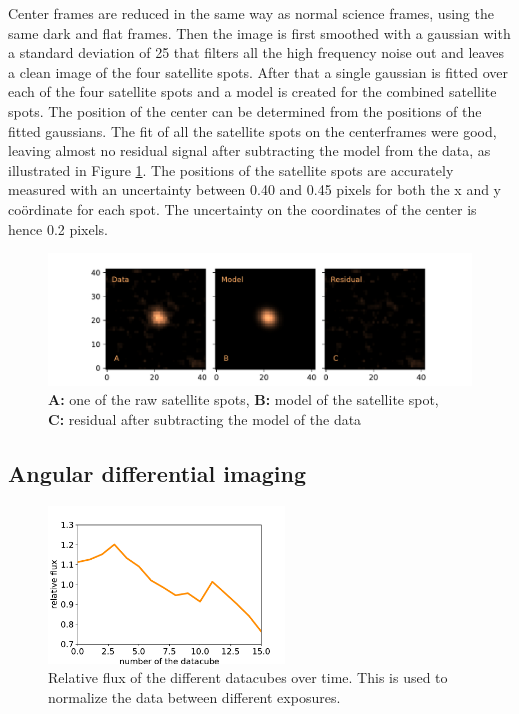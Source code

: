 \documentclass[twoside,single]{lion-msc}
\begin{document}
\bigskip
Center frames are reduced in the same way as normal science frames, using the same dark and flat frames. Then the image is first smoothed with a gaussian with a standard deviation of 25 that filters all the high frequency noise out and leaves a clean image of the four satellite spots. After that a single gaussian is fitted over each of the four satellite spots and a model is created for the combined satellite spots. The position of the center can be determined from the positions of the fitted gaussians. The fit of all the satellite spots on the centerframes were good, leaving almost no residual signal after subtracting the model from the data, as illustrated in Figure \ref{fig:resultmodel}. The positions of the satellite spots are accurately measured with an uncertainty between 0.40 and 0.45 pixels for both the x and y co\"ordinate for each spot. The uncertainty on the coordinates of the center is hence 0.2 pixels.

\begin{figure}[!t]
\centering 
\includegraphics[width = \textwidth]{resultmodel}
\caption{\textbf{A:} one of the raw satellite spots, \textbf{B:} model of the satellite spot,\\ \textbf{C:} residual after subtracting the model of the data} 
\label{fig:resultmodel}
\end{figure}

\subsection{Angular differential imaging}

\begin{figure}
\centering
\includegraphics[width = 0.56\textwidth]{aonorm}
\caption{Relative flux of the different datacubes over time. This is used to normalize the data between different exposures.}
\label{fig:aonorm}
\end{figure}
\end{document}
